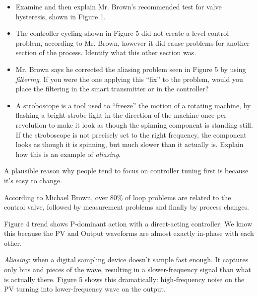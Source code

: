 \begin{itemize}
\item{} Examine and then explain Mr. Brown's recommended test for valve hysteresis, shown in Figure 1.
\item{} The controller cycling shown in Figure 5 did not create a level-control problem, according to Mr. Brown, however it did cause problems for another section of the process.  Identify what this other section was.
\item{} Mr. Brown says he corrected the aliasing problem seen in Figure 5 by using {\it filtering}.  If you were the one applying this ``fix'' to the problem, would you place the filtering in the smart transmitter or in the controller?
\item{} A stroboscope is a tool used to ``freeze'' the motion of a rotating machine, by flashing a bright strobe light in the direction of the machine once per revolution to make it look as though the spinning component is standing still.  If the stroboscope is not precisely set to the right frequency, the component looks as though it is spinning, but much slower than it actually is.  Explain how this is an example of {\it aliasing}.
\end{itemize}














A plausible reason why people tend to focus on controller tuning first is because it's easy to change.  

\vskip 10pt

According to Michael Brown, over 80\% of loop problems are related to the control valve, followed by measurement problems and finally by process changes.

\vskip 10pt

Figure 4 trend shows P-dominant action with a direct-acting controller.  We know this because the PV and Output waveforms are almost exactly in-phase with each other.

\vskip 10pt

{\it Aliasing}: when a digital sampling device doesn't sample fast enough.  It captures only bits and pieces of the wave, resulting in a slower-frequency signal than what is actually there.  Figure 5 shows this dramatically: high-frequency noise on the PV turning into lower-frequency wave on the output.

